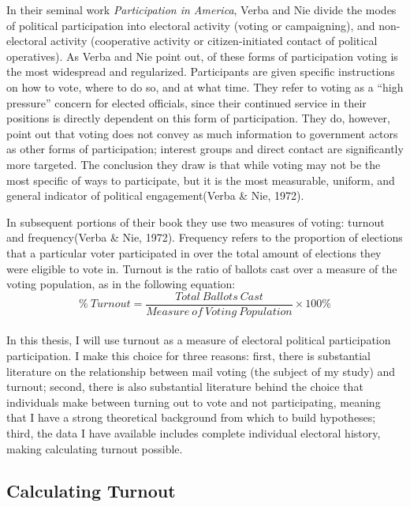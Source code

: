 \documentclass[12pt,twoside]{reedthesis}
\begin{document}
  In their seminal work \emph{Participation in America}, Verba and Nie
  divide the modes of political participation into electoral activity
  (voting or campaigning), and non-electoral activity (cooperative
  activity or citizen-initiated contact of political operatives). As Verba
  and Nie point out, of these forms of participation voting is the most
  widespread and regularized. Participants are given specific instructions
  on how to vote, where to do so, and at what time. They refer to voting
  as a ``high pressure'' concern for elected officials, since their
  continued service in their positions is directly dependent on this form
  of participation. They do, however, point out that voting does not
  convey as much information to government actors as other forms of
  participation; interest groups and direct contact are significantly more
  targeted. The conclusion they draw is that while voting may not be the
  most specific of ways to participate, but it is the most measurable,
  uniform, and general indicator of political engagement(Verba \& Nie,
  1972).
  
  In subsequent portions of their book they use two measures of voting:
  turnout and frequency(Verba \& Nie, 1972). Frequency refers to the
  proportion of elections that a particular voter participated in over the
  total amount of elections they were eligible to vote in. Turnout is the
  ratio of ballots cast over a measure of the voting population, as in the
  following equation:\\
  \[ \% ~Turnout = \frac{Total~Ballots~Cast}{Measure~of~Voting~Population}\times100\%\]\\
  In this thesis, I will use turnout as a measure of electoral political
  participation participation. I make this choice for three reasons:
  first, there is substantial literature on the relationship between mail
  voting (the subject of my study) and turnout; second, there is also
  substantial literature behind the choice that individuals make between
  turning out to vote and not participating, meaning that I have a strong
  theoretical background from which to build hypotheses; third, the data I
  have available includes complete individual electoral history, making
  calculating turnout possible.
  
  \subsection{Calculating Turnout}\label{calculating-turnout}
  
\end{document}
